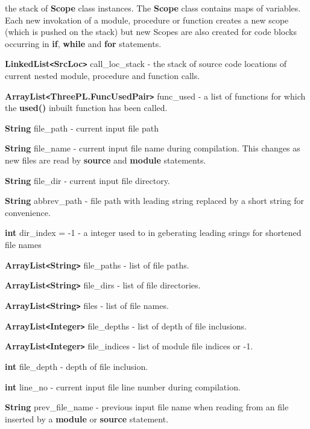 \documentclass[10pt,a4paper,twoside,fleqn]{book}
\begin{document}
            the stack of {\bf Scope} class instances. The {\bf Scope} class contains
            maps of variables. Each new invokation of a module,
            procedure or function creates a new scope (which is pushed on the stack)
            but new Scopes are also created for code blocks occurring in {\bf if},
            {\bf while} and {\bf for} statements.

            {\bf LinkedList\verb'<'SrcLoc\verb'>'} call\_loc\_stack -  the
            stack of source code locations of current nested module, procedure and
            function calls.
            
            {\bf ArrayList\verb'<'ThreePL.FuncUsedPair\verb'>'} func\_used -  a list of
            functions for which the {\bf used()} inbuilt function has been called.
            
            {\bf String} file\_path - current input file path

            {\bf String} file\_name - current input file name during compilation.
            This changes as new files are read by {\bf source} and {\bf module}
            statements.

            {\bf String} file\_dir - current input file directory.

            {\bf String} abbrev\_path - file path with leading string replaced by
            a short string for convenience.

            {\bf int} dir\_index = -1 - a integer used to in geberating leading srings
            for shortened file names

            {\bf ArrayList\verb'<'String\verb'>'} file\_paths - list of file paths.
            
            {\bf ArrayList\verb'<'String\verb'>'} file\_dirs - list of file directories.
            
            {\bf ArrayList\verb'<'String\verb'>'} files - list of file names.
            
            {\bf ArrayList\verb'<'Integer\verb'>'} file\_depths - list of depth of file inclusions.
            
            {\bf ArrayList\verb'<'Integer\verb'>'} file\_indices - list of module file indices or -1.
            
            {\bf int} file\_depth - depth of file inclusion.

            {\bf int} line\_no - current input file line number during
            compilation.

            {\bf String} prev\_file\_name -  previous input file name
            when reading from an file inserted by a {\bf module} or {\bf source}
            statement.
\end{document}
